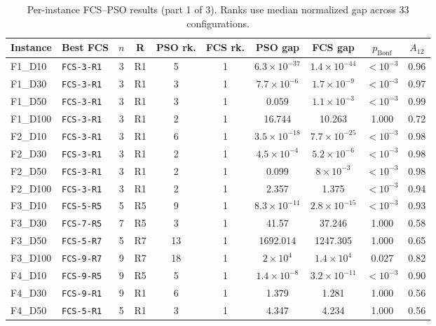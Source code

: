 \begin{table}[H]
\centering
\footnotesize
\caption{Per-instance FCS--PSO results (part 1 of 3). Ranks use median normalized gap across 33 configurations.}
\label{tab:function_level_full_1}
\setlength{\tabcolsep}{3pt}
\begin{tabular}{llcccccccc}
\toprule
\textbf{Instance} & \textbf{Best FCS} & \boldmath$n$ & \textbf{R} & \textbf{PSO rk.} & \textbf{FCS rk.} & \textbf{PSO gap} & \textbf{FCS gap} & \boldmath$p_{\mathrm{Bonf}}$ & \boldmath$A_{12}$ \\
\midrule
F1\_D10 & \texttt{FCS-3-R1} & 3 & R1 & 5 & 1 & $6.3\!\times10^{-37}$ & $1.4\!\times10^{-44}$ & $<10^{-3}$ & 0.96 \\
F1\_D30 & \texttt{FCS-3-R1} & 3 & R1 & 3 & 1 & $7.7\!\times10^{-6}$ & $1.7\!\times10^{-9}$ & $<10^{-3}$ & 0.97 \\
F1\_D50 & \texttt{FCS-3-R1} & 3 & R1 & 3 & 1 & 0.059 & $1.1\!\times10^{-3}$ & $<10^{-3}$ & 0.99 \\
F1\_D100 & \texttt{FCS-3-R1} & 3 & R1 & 2 & 1 & 16.744 & 10.263 & 1.000 & 0.72 \\
F2\_D10 & \texttt{FCS-3-R1} & 3 & R1 & 6 & 1 & $3.5\!\times10^{-18}$ & $7.7\!\times10^{-25}$ & $<10^{-3}$ & 0.98 \\
F2\_D30 & \texttt{FCS-3-R1} & 3 & R1 & 2 & 1 & $4.5\!\times10^{-4}$ & $5.2\!\times10^{-6}$ & $<10^{-3}$ & 0.98 \\
F2\_D50 & \texttt{FCS-3-R1} & 3 & R1 & 2 & 1 & 0.099 & $8\!\times10^{-3}$ & $<10^{-3}$ & 0.98 \\
F2\_D100 & \texttt{FCS-3-R1} & 3 & R1 & 2 & 1 & 2.357 & 1.375 & $<10^{-3}$ & 0.94 \\
F3\_D10 & \texttt{FCS-5-R5} & 5 & R5 & 9 & 1 & $8.3\!\times10^{-11}$ & $2.8\!\times10^{-15}$ & $<10^{-3}$ & 0.93 \\
F3\_D30 & \texttt{FCS-7-R5} & 7 & R5 & 3 & 1 & 41.57 & 37.246 & 1.000 & 0.58 \\
F3\_D50 & \texttt{FCS-5-R7} & 5 & R7 & 13 & 1 & 1692.014 & 1247.305 & 1.000 & 0.65 \\
F3\_D100 & \texttt{FCS-9-R7} & 9 & R7 & 18 & 1 & $2\!\times10^{4}$ & $1.4\!\times10^{4}$ & 0.027 & 0.82 \\
F4\_D10 & \texttt{FCS-9-R5} & 9 & R5 & 5 & 1 & $1.4\!\times10^{-8}$ & $3.2\!\times10^{-11}$ & $<10^{-3}$ & 0.90 \\
F4\_D30 & \texttt{FCS-9-R1} & 9 & R1 & 6 & 1 & 1.379 & 1.281 & 1.000 & 0.56 \\
F4\_D50 & \texttt{FCS-5-R1} & 5 & R1 & 3 & 1 & 4.347 & 4.234 & 1.000 & 0.56 \\

\end{tabular}
\end{table}

